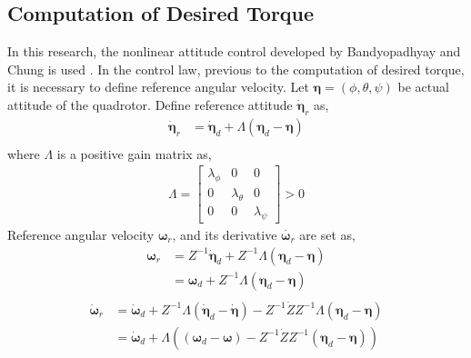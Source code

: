 \subsection{Computation of Desired Torque}

In this research, the nonlinear attitude control developed by Bandyopadhyay and Chung is used \cite{Bandyopadhyay16}. In the control law, previous to the computation of desired torque, it is necessary to define reference angular velocity. Let \( {\boldsymbol \eta} = (\phi, \theta, \psi) \) be actual attitude of the quadrotor. Define reference attitude \( {\dot {\boldsymbol \eta}_r}\) as, \\
\begin{equation}
\label{eq:eta_r}
\begin{aligned}
{\dot {\boldsymbol \eta}_r} & =  {\dot {\boldsymbol \eta}_d} + \Lambda( {\boldsymbol \eta}_d - {\boldsymbol \eta}) \\
\end{aligned}
\end{equation}
where \(\Lambda\) is a positive gain matrix as, \\
\begin{equation}
\begin{aligned}
\Lambda = 
\begin{bmatrix}
\lambda_{\phi}		& 0				& 0 \\
0				& \lambda_{\theta}	& 0 \\
0				& 0				& \lambda_{\psi}
\end{bmatrix}
> 0
\end{aligned}
\end{equation}
Reference angular velocity \({\boldsymbol \omega}_r \), and its derivative \( \dot{{\boldsymbol \omega}_r } \) are set as,\\
\begin{equation}
\begin{aligned}
{\boldsymbol \omega}_r & = Z^{-1} {\dot {\boldsymbol \eta}_d} + Z^{-1} \Lambda ({\boldsymbol \eta}_d - {\boldsymbol \eta})  \\
& = {\boldsymbol \omega}_d + Z^{-1} \Lambda ({\boldsymbol \eta}_d - {\boldsymbol \eta})\\
\end{aligned}
\end{equation}
\begin{equation}
\begin{aligned}
{\dot {\boldsymbol \omega}_r} & = {\dot {\boldsymbol \omega}_d} +  Z^{-1} \Lambda ({\dot {\boldsymbol \eta}_d} - \dot{\boldsymbol \eta}) -  Z^{-1} {\dot Z} Z^{-1}\Lambda ({{\boldsymbol \eta}_d} - {\boldsymbol \eta})\\
& = {\dot {\boldsymbol \omega}_d} + \Lambda \left( ({\boldsymbol \omega}_d - {\boldsymbol \omega}) -  Z^{-1} {\dot Z} Z^{-1} ({{\boldsymbol \eta}_d} - {\boldsymbol \eta}) \right)\\
\end{aligned}
\end{equation}
